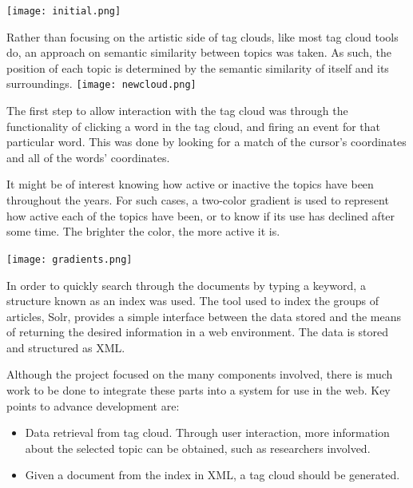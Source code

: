 \documentclass[a0paper, portrait]{baposter}
\begin{document}
\begin{poster}
{    %
    \texttt{[image: initial.png]}
  }

   {
    Rather than focusing on the artistic side of tag clouds, like most tag cloud tools do, an approach on semantic similarity between topics was taken. As such, the position of each topic is determined by the semantic similarity of itself and its surroundings.
    \newline
    \texttt{[image: newcloud.png]}
  }

   {
    The first step to allow interaction with the tag cloud was through the functionality of clicking a word in the tag cloud, and firing an event for that particular word. This was done by looking for a match of the cursor's coordinates and all of the words' coordinates.  
  }

   {
    It might be of interest knowing how active or inactive the topics have been throughout the years. For such cases, a two-color gradient is used to represent how active each of the topics have been, or to know if its use has declined after some time. The brighter the color, the more active it is. %

    \texttt{[image: gradients.png]}

  }

   {
    In order to quickly search through the documents by typing a keyword, a structure known as an index was used. The tool used to index the groups of articles, Solr, provides a simple interface between the data stored and the means of returning the desired information in a web environment. The data is stored and structured as XML. %

  }
  
   {
    Although the project focused on the many components involved, there is much work to be done to integrate these parts into a system for use in the web. Key points to advance development are:
    \begin{itemize}
      \item Data retrieval from tag cloud. Through user interaction, more information about the selected topic can be obtained, such as researchers involved.
      \item Given a document from the index in XML, a tag cloud should be generated.
    \end{itemize}

}
\end{poster}
\end{document}
